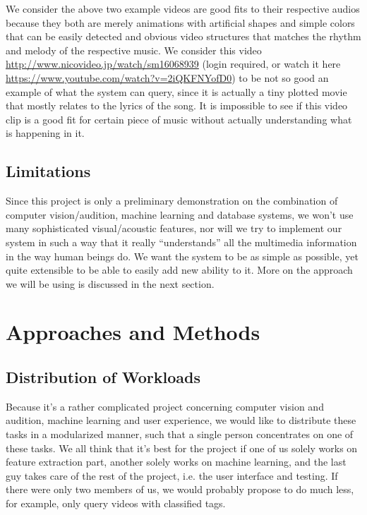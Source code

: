 \documentclass{report}
\begin{document}
We consider the above two example videos are good fits to their respective audios because they both are merely animations with artificial shapes and simple colors that can be easily detected and obvious video structures that matches the rhythm and melody of the respective music. We consider this video \url{http://www.nicovideo.jp/watch/sm16068939} (login required, or watch it here \url{https://www.youtube.com/watch?v=2iQKFNYofD0}) to be not so good an example of what the system can query, since it is actually a tiny plotted movie that mostly relates to the lyrics of the song. It is impossible to see if this video clip is a good fit for certain piece of music without actually understanding what is happening in it.

\section{Limitations}

Since this project is only a preliminary demonstration on the combination of computer vision/audition, machine learning and database systems, we won't use many sophisticated visual/acoustic features, nor will we try to implement our system in such a way that it really ``understands'' all the multimedia information in the way human beings do. We want the system to be as simple as possible, yet quite extensible to be able to easily add new ability to it. More on the approach we will be using is discussed in the next section.

\chapter{Approaches and Methods}

\section{Distribution of Workloads}

Because it's a rather complicated project concerning computer vision and audition, machine learning and user experience, we would like to distribute these tasks in a modularized manner, such that a single person concentrates on one of these tasks. We all think that it's best for the project if one of us solely works on feature extraction part, another solely works on machine learning, and the last guy takes care of the rest of the project, i.e. the user interface and testing. If there were only two members of us, we would probably propose to do much less, for example, only query videos with classified tags.
\end{document}
